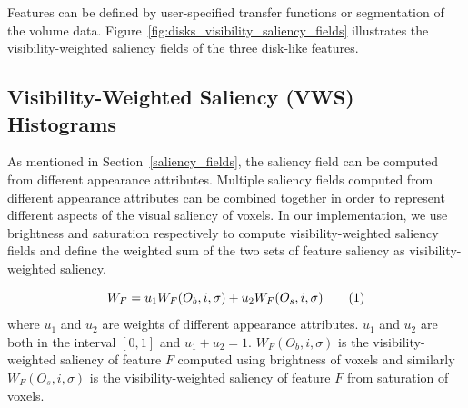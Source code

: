 Features can be defined by user-specified transfer functions or segmentation of the volume data.
Figure~\ref{fig:disks_visibility_saliency_fields} illustrates the visibility-weighted saliency fields of the three disk-like features.

\subsection{Visibility-Weighted Saliency (VWS) Histograms \label{weighted_feature_saliency}}
As mentioned in Section~\ref{saliency_fields}, the saliency field can be computed from different appearance attributes.
Multiple saliency fields computed from different appearance attributes can be combined together in order to represent different aspects of the visual saliency of voxels.
In our implementation, we use brightness and saturation respectively to compute visibility-weighted saliency fields and define the weighted sum of the two sets of feature saliency as visibility-weighted saliency.


\[ W_{F}=u_{1}W_{F}(O_{b},i,\sigma)+u_{2}W_{F}(O_{s},i,\sigma)
\addtag \]
where $ u_{1}$ and $ u_{2}$ are weights of different appearance attributes. $ u_{1}$ and $ u_{2}$ are both in the interval $[0,1] $ and $ u_{1}+u_{2}=1 $. $ W_{F}(O_{b},i,\sigma) $ is the visibility-weighted saliency of feature $ F $ computed using brightness of voxels and similarly $ W_{F}(O_{s},i,\sigma) $ is the visibility-weighted saliency of feature $ F $ from saturation of voxels.


